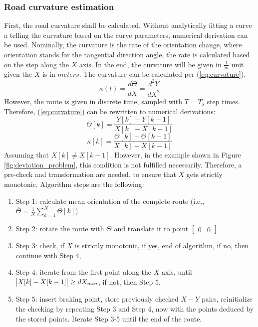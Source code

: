 \documentclass[sn-mathphys-num]{sn-jnl}%
\begin{document}
\subsubsection{Road curvature estimation}
First, the road curvature shall be calculated. Without analytically fitting a curve a telling the curvature based on the curve parameters, numerical derivation can be used.
Nominally, the curvature is the rate of the orientation change, where orientation stands for the tangential direction angle, the rate is calculated based on the step along 
the $X$ axis. In the end, the curvature will be given in $\frac{1}{m}$ unit given the $X$ is in $meters$. The curvature can be calculated per (\ref{eq:curvature}).
\begin{equation} \label{eq:curvature}
    \kappa(t) = \frac{d\Theta}{dX} = \frac{d^2Y}{dX^2}
\end{equation} 
However, the route is given in discrete time, sampled with $T=T_s$ step times. Therefore, (\ref{eq:curvature}) can be rewritten to numerical derivations:
\begin{equation} \label{eq:discrete_orientation}
    \Theta[k] = \frac{Y[k]-Y[k-1]}{X[k]-X[k-1]}
\end{equation}
\begin{equation} \label{eq:discrete_curvature}
    \kappa[k] = \frac{\Theta[k]-\Theta[k-1]}{X[k]-X[k-1]}
\end{equation}
Assuming that $X[k] \neq X[k-1]$. However, in the example shown in Figure \ref{fig:deviation_problem}, this condition is not fulfilled necessarily. Therefore, a pre-check and 
transformation are needed, to ensure that $X$ gets strictly monotonic. Algorithm steps are the following:
\begin{enumerate}
    \item Step 1: calculate mean orientation of the complete route (i.e., $\overline{\Theta} = \frac{1}{N}\sum_{k=1}^{N}\Theta[k]$)
    \item Step 2: rotate the route with $\overline{\Theta}$ and translate it to point $\begin{bmatrix}
        0 & 0 \end{bmatrix}$
    \item Step 3: check, if $X$ is strictly monotonic, if yes, end of algorithm, if no, then continue with Step 4,
    \item Step 4: iterate from the first point along the $X$ axis, until $\abs{X[k]-X[k-1]} \ge dX_{min}$, if not, then Step 5,
    \item Step 5: insert braking point, store previously checked $X-Y$ pairs, reinitialize the checking by repeating Step 3 and Step 4, now with the points deduced by the stored points. Iterate Step 3-5 until the end of the route.
\end{enumerate}
\end{document}
